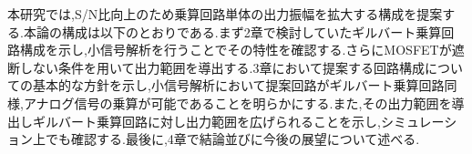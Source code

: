\par
本研究では,S/N比向上のため乗算回路単体の出力振幅を拡大する構成を提案する.本論の構成は以下のとおりである.まず2章で検討していたギルバート乗算回路構成を示し,小信号解析を行うことでその特性を確認する.さらにMOSFETが遮断しない条件を用いて出力範囲を導出する.3章において提案する回路構成についての基本的な方針を示し,小信号解析において提案回路がギルバート乗算回路同様,アナログ信号の乗算が可能であることを明らかにする.また,その出力範囲を導出しギルバート乗算回路に対し出力範囲を広げられることを示し,シミュレーション上でも確認する.最後に,4章で結論並びに今後の展望について述べる.